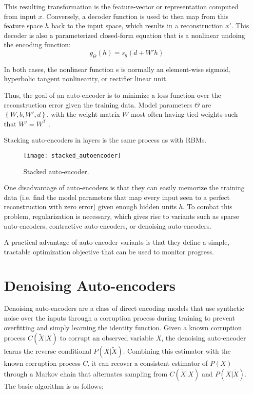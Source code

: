 This resulting transformation is the feature-vector or representation computed from input \(x\).
Conversely, a decoder function is used to then map from this feature space \(h\) back to the input space, which results in a reconstruction \(x'\). This decoder is also a parameterized closed-form equation that is a nonlinear undoing the encoding function:
\[g_\Theta (h) = s_g (d + W' h)\]

In both cases, the nonlinear function s is normally an element-wise sigmoid, hyperbolic tangent nonlinearity, or rectifier linear unit.

Thus, the goal of an auto-encoder is to minimize a loss function over the reconstruction error given the training data. Model parameters \(\Theta\) are \(\left\{W,b,W',d\right\}\), with the weight matrix \(W\) most often having tied weights such that \(W' = W^T\) .

Stacking auto-encoders in layers is the same process as with RBMs.
\begin{figure}[h!]
  \centering
    \texttt{[image: stacked\_autoencoder]}
\caption{Stacked auto-encoder.}
\end{figure}

One disadvantage of auto-encoders is that they can easily memorize the training data (i.e. find the model parameters that map every input seen to a perfect reconstruction with zero error) given enough hidden units \(h\). To combat this problem, regularization is necessary, which gives rise to variants such as sparse auto-encoders, contractive auto-encoders, or denoising auto-encoders.

A practical advantage of auto-encoder variants is that they define a simple, tractable optimization objective that can be used to monitor progress.

\section{Denoising Auto-encoders}
Denoising auto-encoders \cite{bengio13a, vincent08} are a class of direct encoding models that use synthetic noise over the inputs through a corruption process during training to prevent overfitting and simply learning the identity function. Given a known corruption process \(C(\widetilde{X}|X)\) to corrupt an observed variable \(X\), the denoising auto-encoder learns the reverse conditional \(P(X|\widetilde{X})\). Combining this estimator with the known corruption process \(C\), it can recover a consistent estimator of \(P(X)\) through a Markov chain that alternates sampling from \(C(\widetilde{X}|X)\) and \(P(X|\widetilde{X})\). The basic algorithm is as follows:

